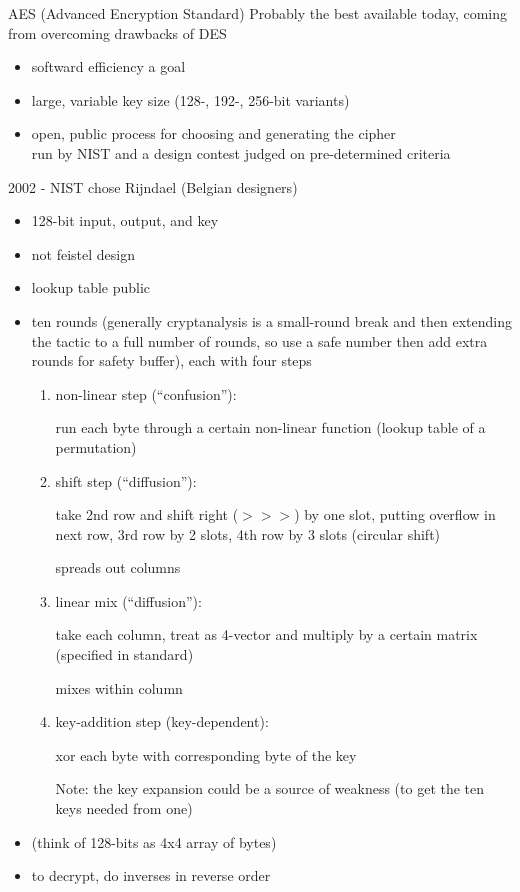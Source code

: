 \begin{example}{AES (Advanced Encryption Standard)}
    Probably the best available today, coming from overcoming drawbacks of DES
    \begin{itemize}
        \item softward efficiency a goal
        \item large, variable key size (128-, 192-, 256-bit variants)
        \item open, public process for choosing and generating the cipher\\
            run by NIST and a design contest judged on pre-determined criteria
    \end{itemize}

    2002 - NIST chose Rijndael (Belgian designers)
\end{example}

\begin{itemize}
    \item 128-bit input, output, and key
    \item not feistel design
    \item lookup table public

    \item ten rounds (generally cryptanalysis is a small-round break and then
            extending the tactic to a full number of rounds, so use a safe
            number then add extra rounds for safety buffer), each with four steps
        \begin{enumerate}
            \item non-linear step (``confusion''):

                run each byte through a certain non-linear function (lookup
                table of a permutation)
            \item shift step (``diffusion''):

                take 2nd row and shift right ($>>>$) by one slot, putting
                overflow in next row, 3rd row by 2 slots, 4th row by 3 slots
                (circular shift)

                spreads out columns
            \item linear mix (``diffusion''):

                take each column, treat as 4-vector and multiply by a certain
                matrix (specified in standard)

                mixes within column
            \item key-addition step (key-dependent):

                xor each byte with corresponding byte of the key

                Note: the key expansion could be a source of weakness (to get
                the ten keys needed from one)
        \end{enumerate}
    \item (think of 128-bits as 4x4 array of bytes)
    \item to decrypt, do inverses in reverse order
\end{itemize}

